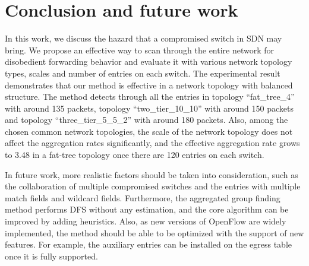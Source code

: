 \chapter{Conclusion and future work}
\label{conclusion}
In this work, we discuss the hazard that a compromised switch in SDN may bring. We propose an effective way to scan through the entire network for disobedient forwarding behavior and evaluate it with various network topology types, scales and number of entries on each switch. The experimental result demonstrates that our method is effective in a network topology with balanced structure. The method detects through all the entries in topology ``fat\_tree\_4'' with around 135 packets, topology ``two\_tier\_10\_10'' with around 150 packets and topology ``three\_tier\_5\_5\_2'' with around 180 packets. Also, among the chosen common network topologies, the scale of the network topology does not affect the aggregation rates significantly, and the effective aggregation rate grows to 3.48 in a fat-tree topology once there are 120 entries on each switch. 

In future work, more realistic factors should be taken into consideration, such as the collaboration of multiple compromised switches and the entries with multiple match fields and wildcard fields. Furthermore, the aggregated group finding method performs DFS without any estimation, and the core algorithm can be improved by adding heuristics. Also, as new versions of OpenFlow are widely implemented, the method should be able to be optimized with the support of new features. For example, the auxiliary entries can be installed on the egress table once it is fully supported.